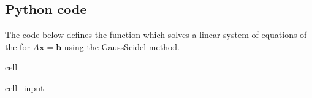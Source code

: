 \documentclass[letterpaper,10pt,english]{jupyterBook}
\begin{document}
\subsection{Python code}
\label{\detokenize{7_Indirect_methods/7.2_Gauss_Seidel_method:python-code}}
\sphinxAtStartPar
The code below defines the function  which solves a linear system of equations of the for \(A \mathbf{x} = \mathbf{b}\) using the Gauss\sphinxhyphen{}Seidel method.

\begin{sphinxuseclass}{cell}\begin{sphinxVerbatimInput}

\begin{sphinxuseclass}{cell_input}
\begin{sphinxVerbatim}[commandchars=\\\{\}]
   
      
      
      
       
           
              \PYG{p}{[}\PYG{p}{]}
               
                   
                      \PYG{p}{[}\PYG{p}{]}  \PYG{p}{[}\PYG{p}{]}
        
            \PYG{p}{[}\PYG{p}{]}    \PYG{p}{[}\PYG{p}{]}
            
                
           
    
     
\end{sphinxVerbatim}

\end{sphinxuseclass}\end{sphinxVerbatimInput}

\end{sphinxuseclass}
\sphinxstepscope
\end{document}
